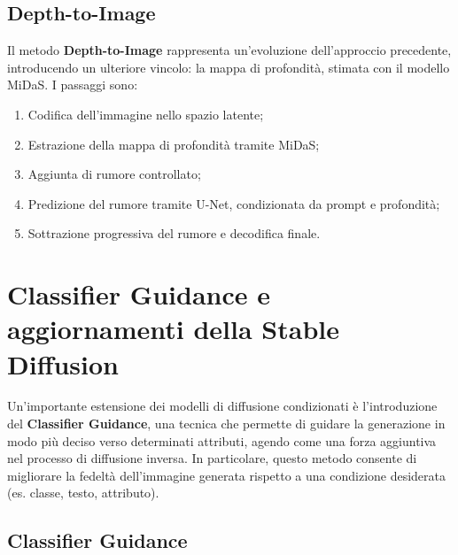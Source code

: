 \subsection{Depth-to-Image}

Il metodo \textbf{Depth-to-Image} rappresenta un’evoluzione dell’approccio precedente, introducendo un ulteriore vincolo: la mappa di profondità, stimata con il modello MiDaS. I passaggi sono:

\begin{enumerate}
    \item Codifica dell’immagine nello spazio latente;
    \item Estrazione della mappa di profondità tramite MiDaS;
    \item Aggiunta di rumore controllato;
    \item Predizione del rumore tramite U-Net, condizionata da prompt e profondità;
    \item Sottrazione progressiva del rumore e decodifica finale.
\end{enumerate}

\section{Classifier Guidance e aggiornamenti della Stable Diffusion}

Un'importante estensione dei modelli di diffusione condizionati è l'introduzione del \textbf{Classifier Guidance}, una tecnica che permette di guidare la generazione in modo più deciso verso determinati attributi, agendo come una forza aggiuntiva nel processo di diffusione inversa. In particolare, questo metodo consente di migliorare la fedeltà dell'immagine generata rispetto a una condizione desiderata (es. classe, testo, attributo).

\subsection{Classifier Guidance}


